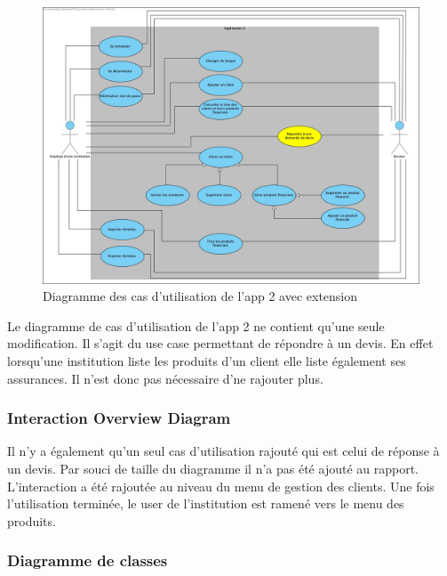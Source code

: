 \documentclass[../rapport.tex]{subfiles}
\begin{document}
				\begin{figure}[h]
						\center\includegraphics[scale = 0.27]{ressources/photos_diagrammes/extensionThomas/useCase2Thomas.jpg}
						\caption{Diagramme des cas d'utilisation de l'app 2 avec extension}
				\end{figure}

				Le diagramme de cas d'utilisation de l'app 2 ne contient qu'une seule modification.
				Il s'agit du use case permettant de répondre à un devis. En effet lorsqu'une
				institution liste les produits d'un client elle liste également ses assurances.
				Il n'est donc pas nécessaire d'ne rajouter plus.

		\subsubsection{Interaction Overview Diagram}

		Il n'y a également qu'un seul cas d'utilisation rajouté qui est celui de réponse à un
		devis. Par souci de taille du diagramme il n'a pas été ajouté au rapport. L'interaction
		a été rajoutée au niveau du menu de gestion des clients. Une fois l'utilisation terminée,
		le user de l'institution est ramené vers le menu des produits.

		\subsubsection{Diagramme de classes}
\end{document}
